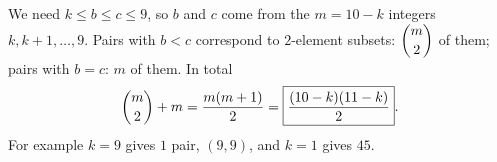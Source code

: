 We need $k\le b\le c\le9$, so $b$ and $c$ come from the $m=10-k$ integers $k,k+1,\dots,9$. Pairs with $b<c$ correspond to $2$-element subsets: $\dbinom m2$ of them; pairs with $b=c$: $m$ of them. In total
\[
\dbinom m2+m=\dfrac{m(m+1)}{2}=\boxed{\dfrac{(10-k)(11-k)}{2}}.
\]
For example $k=9$ gives $1$ pair, $(9,9)$, and $k=1$ gives $45$.
